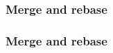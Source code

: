 \documentclass{beamer}
\begin{document}
    \begin{frame}
        \frametitle{Merge and rebase}
        \begin{figure}[H]
            \centering
            \noindent
        \end{figure}
    \end{frame}
    \begin{frame}
        \frametitle{Merge and rebase}
        \begin{figure}[H]
            \centering
            \noindent
        \end{figure}
    \end{frame}
\end{document}
